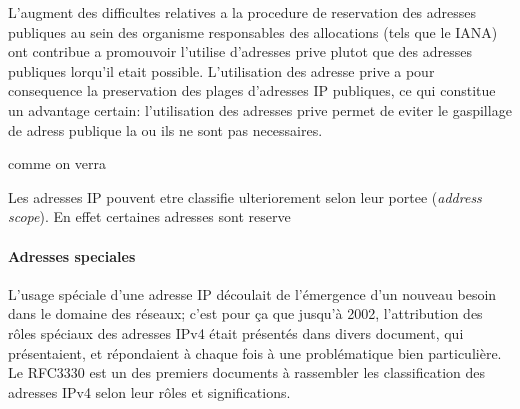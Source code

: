  
L'augment des difficultes relatives a la procedure de reservation des adresses
publiques au sein des organisme responsables des allocations\cite{url-RFC-1918}
(tels que le IANA) ont contribue a promouvoir l'utilise d'adresses prive plutot
que des adresses publiques lorqu'il etait possible.
L'utilisation des adresse prive a pour consequence la preservation des plages
d'adresses IP publiques, ce qui constitue un advantage certain: l'utilisation
des adresses prive permet de eviter le gaspillage de adress publique la ou ils
ne sont pas necessaires.













comme on verra 


Les adresses IP pouvent etre classifie ulteriorement selon
leur portee ({\it address scope}).  En effet certaines adresses sont reserve 



\paragraph{Adresses speciales}
L'usage spéciale d'une adresse IP découlait de l'émergence
d'un nouveau besoin dans le domaine des réseaux; c'est pour
ça que jusqu'à 2002, l'attribution des rôles spéciaux des adresses
IPv4 était présentés dans divers document, qui présentaient, et répondaient à chaque fois à une
problématique bien particulière. Le RFC3330 est un des premiers documents à
rassembler les classification des adresses IPv4 selon leur rôles et significations.


